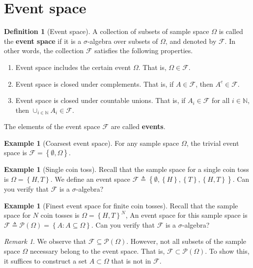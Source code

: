 \documentclass[letterpaper,10pt,english]{article}
\theoremstyle{plain}
\theoremstyle{definition}
\newtheorem{defn}[thm]{Definition}
\newtheorem{exmp}[thm]{Example}
\theoremstyle{remark}
\newtheorem{rem}{Remark}
\newcommand{\EQ}[1]{\begin{equation*}#1\end{equation*}}
\newcommand{\set}[1]{\left\{#1\right\}}
\newcommand{\N}{\mathbb{N}}
\newcommand{\cP}{\mathcal{P}}
\newcommand{\sF}{\mathscr{F}}
\begin{document}
\section{Event space}
\begin{defn}[Event space]
A collection of subsets of sample space $\Omega$ is called the \textbf{event space} if it is a $\sigma$-algebra over subsets of $\Omega$, and denoted by $\sF$. 
In other words, the collection $\sF$ satisfies the following properties. 
\begin{enumerate}
\item Event space includes the certain event $\Omega$. That is, $\Omega \in \sF$. 
\item Event space is closed under complements. That is, if $A \in \sF$, then $A^c \in \sF$. 
\item Event space is closed under countable unions. That is, if $A_i \in \sF$ for all $i \in \N$, then $\cup_{i \in \N}A_i \in \sF$.
\end{enumerate}
The elements of the event space $\sF$ are called \textbf{events}. 
\end{defn}
\begin{shaded}
\begin{exmp}[Coarsest event space]
For any sample space $\Omega$, the trivial event space is $\sF = \set{\emptyset, \Omega}$. 
\end{exmp}
\begin{exmp}[Single coin toss] 
Recall that the sample space for a single coin toss is $\Omega = \set{H, T}$. 
We define an event space $\sF \triangleq \set{\emptyset, \set{H}, \set{T}, \set{H,T}}$. 
Can you verify that $\sF$ is a $\sigma$-algebra?
\end{exmp}
\begin{exmp}[Finest event space for finite coin tosses] 
Recall that the sample space for $N$ coin tosses is $\Omega = \set{H, T}^N$, 
An event space for this sample space is $\sF \triangleq \cP(\Omega) = \set{A: A \subseteq \Omega}$. 
Can you verify that $\sF$ is a $\sigma$-algebra?
\end{exmp}
\end{shaded}
\begin{rem}
We observe that $\sF \subseteq \cP(\Omega)$. 
However, not all subsets of the sample space $\Omega$ necessary belong to the event space. 
That is, $\sF \subset \cP(\Omega)$. 
To show this, it suffices to construct a set $A \subset \Omega$ that is not in $\sF$. 
\end{rem}
\end{document}
